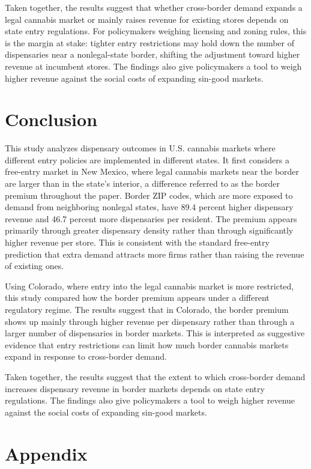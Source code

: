 \documentclass[12pt]{article}
\begin{document}
Taken together, the results suggest that whether cross-border demand expands a legal cannabis market or mainly raises revenue for existing stores depends on state entry regulations. For policymakers weighing licensing and zoning rules, this is the margin at stake: tighter entry restrictions may hold down the number of dispensaries near a nonlegal-state border, shifting the adjustment toward higher revenue at incumbent stores. The findings also give policymakers a tool to weigh higher revenue against the social costs of expanding sin-good markets.

\section{Conclusion}
\label{conclusion}

This study analyzes dispensary outcomes in U.S. cannabis markets where different entry policies are implemented
in different states. It first considers a free-entry market in New Mexico, where legal cannabis markets near the border are larger than in the state’s interior, a difference referred to as the border premium throughout the paper. Border ZIP codes, which are more exposed to demand from neighboring nonlegal states, have 89.4 percent higher dispensary revenue and 46.7 percent more dispensaries per resident.
The premium appears
primarily through greater dispensary density rather than through significantly higher revenue per store. This is consistent with the standard free-entry prediction that extra demand attracts more firms rather than raising the revenue of existing ones.

Using Colorado, where entry into the legal cannabis market is more restricted, this study compared how the border premium appears under a different regulatory regime. The results suggest that in Colorado, the border premium shows up mainly through higher revenue per dispensary rather than through a larger number of dispensaries in border markets. This is interpreted as suggestive evidence that entry restrictions can limit how much border cannabis markets expand in response to cross-border demand.

Taken together, the results suggest that the extent to which cross-border demand increases dispensary revenue in border markets depends on state entry regulations.
The findings also give policymakers a tool to weigh higher revenue against the social costs of expanding sin-good markets.

\newpage

\appendix
\section{Appendix}
\renewcommand{\thetable}{A.\arabic{table}}
\renewcommand{\thefigure}{A.\arabic{figure}}
\renewcommand{\theequation}{A.\arabic{equation}}
\setcounter{table}{0}
\setcounter{figure}{0}
\setcounter{equation}{0}
\end{document}
